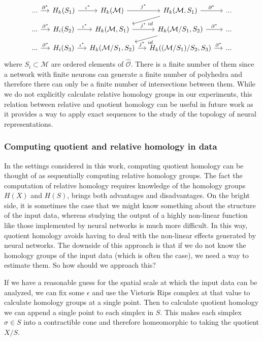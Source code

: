 \documentclass[10pt]{article} %
\theoremstyle{plain}
\theoremstyle{definition}
\theoremstyle{remark}
\begin{document}
\begin{equation*}
    \begin{tikzcd}[row sep=small,column sep=small]
    ... \arrow[r, "\partial^*"] & H_{k}(S_1) \arrow[r, "\iota^*"] & H_k(\mathcal{M}) \arrow[r, "j^*"] & H_k(\mathcal{M},S_1) \arrow[r, "\partial^*"] \arrow[ld, "id"] & ...\\
    ... \arrow[r, "\partial^*"] & H_{i}(S_2) \arrow[r, "\iota^*"] & H_k(\mathcal{M},S_1) \arrow[r, "j^*"] & H_k(\mathcal{M}/S_1,S_2) \arrow[r, "\partial^*"] \arrow[ld, "id"] & ...\\
    ... \arrow[r, "\partial^*"] & H_{i}(S_3) \arrow[r, "\iota^*"] & H_k(\mathcal{M}/S_1,S_2) \arrow[r,  "j^*"] & H_k((\mathcal{M}/S_1)/S_2,S_3) \arrow[r, "\partial^*"] & ...
    \end{tikzcd}
\end{equation*}
 where $S_i \subset \mathcal{M}$ are ordered elements of $\hat{\mathcal{O}}$. There is a finite number of them since a network with finite neurons can generate a finite number of polyhedra and therefore there can only be a finite number of intersections between them. While we do not explicitly calculate relative homology groups in our experiments, this relation between relative and quotient homology can be useful in future work as it provides a way to apply exact sequences to the study of the topology of neural representations.
 
\subsubsection{Computing quotient and relative homology in data}
\label{Relative Homology on Data}
In the settings considered in this work, computing quotient homology can be thought of as sequentially computing relative homology groups. The fact the computation of relative homology requires knowledge of the homology groups $H(X)$ and $H(S)$, brings both advantages and disadvantages. On the bright side, it is sometimes the case that we might know something about the structure of the input data, whereas studying the output of a highly non-linear function like those implemented by neural networks is much more difficult. In this way, quotient homology avoids having to deal with the non-linear effects generated by neural networks. 
The downside of this approach is that if we do not know the homology groups of the input data (which is often the case), we need a way to estimate them. So how should we approach this?

If we have a reasonable guess for the spatial scale at which the input data can be analyzed, we can fix some $\epsilon$ and use the Vietoris Rips complex at that value to calculate homology groups at a single point. Then to calculate quotient homology we can append a single point to each simplex in $S$. This makes each simplex $\sigma \in S$ into a contractible cone and therefore homeomorphic to taking the quotient $X/S$. 
\end{document}
